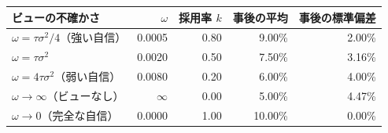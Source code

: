 \begin{tabular}{lrrrr}
\toprule
ビューの不確かさ & $\omega$ & 採用率 $k$ & 事後の平均 & 事後の標準偏差 \\
\midrule
$\omega = \tau\sigma^2/4$（強い自信） & 0.0005 & 0.80 & 9.00\% & 2.00\% \\
$\omega = \tau\sigma^2$ & 0.0020 & 0.50 & 7.50\% & 3.16\% \\
$\omega = 4\tau\sigma^2$（弱い自信） & 0.0080 & 0.20 & 6.00\% & 4.00\% \\
$\omega \to \infty$（ビューなし） & $\infty$ & 0.00 & 5.00\% & 4.47\% \\
$\omega \to 0$（完全な自信） & 0.0000 & 1.00 & 10.00\% & 0.00\% \\
\bottomrule
\end{tabular}
